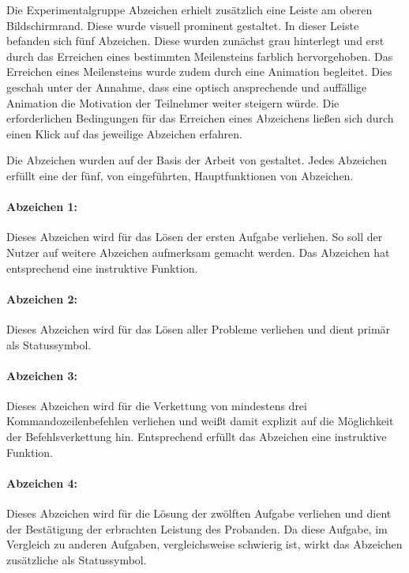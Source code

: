 Die Experimentalgruppe Abzeichen erhielt zusätzlich eine Leiste am oberen Bildschirmrand. Diese wurde visuell prominent gestaltet. In dieser Leiste befanden sich fünf Abzeichen. Diese wurden zunächst grau hinterlegt und erst durch das Erreichen eines bestimmten Meilensteins farblich hervorgehoben. Das Erreichen eines Meilensteins wurde zudem durch eine Animation begleitet. Dies geschah unter der Annahme, dass eine optisch ansprechende und auffällige Animation die Motivation der Teilnehmer weiter steigern würde. Die erforderlichen Bedingungen für das Erreichen eines Abzeichens ließen sich durch einen Klick auf das jeweilige Abzeichen erfahren. 

Die Abzeichen wurden auf der Basis der Arbeit von \citeauthor{antin_badges_2011} gestaltet. Jedes Abzeichen erfüllt eine der fünf, von \citeauthor{antin_badges_2011} eingeführten, Hauptfunktionen von Abzeichen.

\paragraph{Abzeichen 1:}
Dieses Abzeichen wird für das Lösen der ersten Aufgabe verliehen. So soll der Nutzer auf weitere Abzeichen aufmerksam gemacht werden. Das Abzeichen hat entsprechend eine instruktive Funktion.

\paragraph{Abzeichen 2:}
Dieses Abzeichen wird für das Lösen aller Probleme verliehen und dient primär als Statussymbol.

\paragraph{Abzeichen 3:}
Dieses Abzeichen wird für die Verkettung von mindestens drei Kommandozeilenbefehlen verliehen und weißt damit explizit auf die Möglichkeit der Befehlsverkettung hin. Entsprechend erfüllt das Abzeichen eine instruktive Funktion.

\paragraph{Abzeichen 4:}
Dieses Abzeichen wird für die Lösung der zwölften Aufgabe verliehen und dient der Bestätigung der erbrachten Leistung des Probanden. Da diese Aufgabe, im Vergleich zu anderen Aufgaben, vergleichsweise schwierig ist, wirkt das Abzeichen zusätzliche als Statussymbol.

